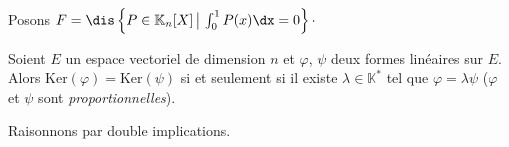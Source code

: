 \documentclass[a4paper,10pt]{report}
\begin{document}
\begin{preuve}
\vspace{12cm}

\newpage

\phantom{9cm}

\vspace{9cm}
\end{preuve}

\begin{ex} Posons $F = \dis \left\lbrace P \in \mathbb{K}_n[X] \, \big{\vert} \, \int_{0}^1 P(x) \dx =0\right\rbrace \cdot$


\vspace{5cm}
\end{ex}

\begin{prop} Soient $E$ un espace vectoriel de dimension $n$ et $\varphi$, $\psi$ deux formes linéaires sur $E$. Alors $\textrm{Ker}(\varphi) = \textrm{Ker}(\psi)$ si et seulement si il existe $\lambda \in \mathbb{K}^*$ tel que $\varphi = \lambda \psi$ ($\varphi$ et $\psi$ sont \textit{proportionnelles}).
\end{prop}

\begin{preuve} Raisonnons par double implications.

\vspace{11cm}
%
%
\end{preuve}
\end{document}
